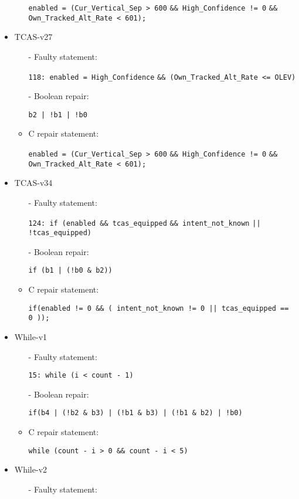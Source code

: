 \begin{itemize}
\begin{itemize}
\lstinline|enabled = (Cur_Vertical_Sep > 600| \lstinline|&& High_Confidence != 0| \lstinline|&& Own_Tracked_Alt_Rate < 601);|
\end{itemize}

\item TCAS-v27
\begin{itemize}
\item[-] Faulty statement:

\lstinline|118: enabled = High_Confidence| \lstinline|&& (Own_Tracked_Alt_Rate <= OLEV)|
\item[-] Boolean repair:

\lstinline{b2 | !b1 | !b0}
\item[-] C repair statement: 

\lstinline|enabled = (Cur_Vertical_Sep > 600| \lstinline|&& High_Confidence != 0| \lstinline|&& Own_Tracked_Alt_Rate < 601);|
\end{itemize}

\item TCAS-v34
\begin{itemize}
\item[-] Faulty statement:

\lstinline|124: if (enabled && tcas_equipped| \lstinline{&& intent_not_known} \lstinline{|| !tcas_equipped)}
\item[-] Boolean repair:

\lstinline{if (b1 | (!b0 & b2))}
\item[-] C repair statement: 

\lstinline{if(enabled != 0 && ( intent_not_known != 0 || tcas_equipped == 0 ));}
\end{itemize}

\item While-v1
\begin{itemize}
\item[-] Faulty statement:

\lstinline|15: while (i < count - 1)|
\item[-] Boolean repair:

\lstinline{if(b4 | (!b2 & b3) | (!b1 & b3) | (!b1 & b2) | !b0)}
\item[-] C repair statement: 

\lstinline|while (count - i > 0 && count - i < 5)|
\end{itemize}

\item While-v2
\begin{itemize}
\item[-] Faulty statement:


\end{itemize}
\end{itemize}
